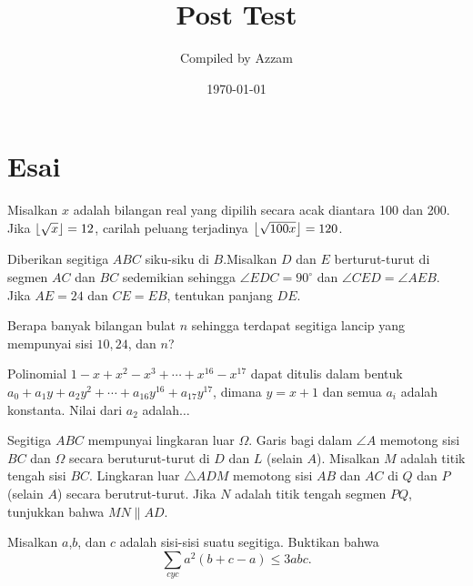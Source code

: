 \documentclass[12pt]{scrartcl}
\begin{document}
	\title{Post Test} %
	\date{\today}
	\author{Compiled by Azzam}
	\maketitle

\renewcommand*\contentsname{Daftar Isi}
\tableofcontents

\newpage
	
	\section{Esai}
	
	\begin{soalbaru}
	Misalkan $x$ adalah bilangan real yang dipilih secara acak diantara 100 dan 200. Jika $\left\lfloor \sqrt{x} \right\rfloor=12$, carilah peluang terjadinya $\left\lfloor \sqrt{100x} \right\rfloor=120$.
	\end{soalbaru}
	
	\begin{soalbaru}
	Diberikan segitiga $ABC$ siku-siku di $B$.Misalkan $D$ dan $E$ berturut-turut di segmen $AC$ dan $BC$ sedemikian sehingga $\angle EDC= 90^\circ$ dan $\angle CED = \angle AEB$. Jika $AE = 24$ dan $CE=EB$, tentukan panjang $DE$.
	\end{soalbaru}
	
	\begin{soalbaru}
	Berapa banyak bilangan bulat $n$ sehingga terdapat segitiga lancip yang mempunyai sisi $10,24$, dan $n$?
	\end{soalbaru}

	\begin{soalbaru}
	Polinomial $1-x+x^2-x^3+\cdots+x^{16}-x^{17}$ dapat ditulis dalam bentuk $a_0+a_1y+a_2y^2+\cdots +a_{16}y^{16}+a_{17}y^{17}$, dimana $y=x+1$ dan semua $a_i$ adalah konstanta. Nilai dari $a_2$ adalah$\dots$
	\end{soalbaru}
 
	\begin{soalbaru}
	Segitiga $ABC$ mempunyai lingkaran luar $\Omega$. Garis bagi dalam $\angle A$ memotong sisi $BC$ dan $\Omega$ secara beruturut-turut di $D$ dan $L$ (selain $A$). Misalkan $M$ adalah titik tengah sisi $BC$. Lingkaran luar $\triangle  ADM$ memotong sisi $AB$ dan $AC$ di $Q$ dan $P$ (selain $A$) secara berutrut-turut. Jika $N$ adalah titik tengah segmen $PQ$, tunjukkan bahwa $MN \parallel AD$. 
	\end{soalbaru}
	
	\begin{soalbaru}
	Misalkan $a$,$b$, dan $c$ adalah sisi-sisi suatu segitiga. Buktikan bahwa$$\sum_{cyc} a^2(b+c-a) \le 3abc.$$
	\end{soalbaru}
\end{document}
